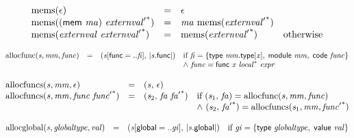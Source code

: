 $$
\begin{array}{@{}lcl@{}l@{}}
{\mathrm{mems}}(\epsilon) &=& \epsilon &  \\
{\mathrm{mems}}((\mathsf{mem}~{\mathit{ma}})~{{\mathit{externval}'}^\ast}) &=& {\mathit{ma}}~{\mathrm{mems}}({{\mathit{externval}'}^\ast}) &  \\
{\mathrm{mems}}({\mathit{externval}}~{{\mathit{externval}'}^\ast}) &=& {\mathrm{mems}}({{\mathit{externval}'}^\ast}) &\quad
  \mbox{otherwise} \\
\end{array}
$$

\vspace{1ex}

\vspace{1ex}

$$
\begin{array}{@{}lcl@{}l@{}}
{\mathrm{allocfunc}}({\mathit{s}}, {\mathit{mm}}, {\mathit{func}}) &=& ({\mathit{s}}{}[\mathsf{func} = ..{\mathit{fi}}],\, {|{\mathit{s}}.\mathsf{func}|}) &\quad
  \mbox{if}~{\mathit{fi}} = \{ \begin{array}[t]{@{}l@{}}
\mathsf{type}~{\mathit{mm}}.\mathsf{type}{}[{\mathit{x}}],\; \mathsf{module}~{\mathit{mm}},\; \mathsf{code}~{\mathit{func}} \}\end{array} \\
 &&&\quad {\land}~{\mathit{func}} = \mathsf{func}~{\mathit{x}}~{{\mathit{local}}^\ast}~{\mathit{expr}} \\
\end{array}
$$

$$
\begin{array}{@{}lcl@{}l@{}}
{\mathrm{allocfuncs}}({\mathit{s}}, {\mathit{mm}}, \epsilon) &=& ({\mathit{s}},\, \epsilon) &  \\
{\mathrm{allocfuncs}}({\mathit{s}}, {\mathit{mm}}, {\mathit{func}}~{{\mathit{func}'}^\ast}) &=& ({\mathit{s}}_{{2}},\, {\mathit{fa}}~{{\mathit{fa}'}^\ast}) &\quad
  \mbox{if}~({\mathit{s}}_{{1}},\, {\mathit{fa}}) = {\mathrm{allocfunc}}({\mathit{s}}, {\mathit{mm}}, {\mathit{func}}) \\
 &&&\quad {\land}~({\mathit{s}}_{{2}},\, {{\mathit{fa}'}^\ast}) = {\mathrm{allocfuncs}}({\mathit{s}}_{{1}}, {\mathit{mm}}, {{\mathit{func}'}^\ast}) \\
\end{array}
$$

$$
\begin{array}{@{}lcl@{}l@{}}
{\mathrm{allocglobal}}({\mathit{s}}, {\mathit{globaltype}}, {\mathit{val}}) &=& ({\mathit{s}}{}[\mathsf{global} = ..{\mathit{gi}}],\, {|{\mathit{s}}.\mathsf{global}|}) &\quad
  \mbox{if}~{\mathit{gi}} = \{ \begin{array}[t]{@{}l@{}}
\mathsf{type}~{\mathit{globaltype}},\; \mathsf{value}~{\mathit{val}} \}\end{array} \\
\end{array}
$$

